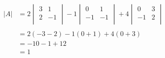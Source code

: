 \documentclass[11pt,a4paper]{article}
\begin{document}
\begin{align*}
|A| &= 2
\begin{vmatrix}
3 & 1\\
2 & -1\\
\end{vmatrix}
-1
\begin{vmatrix}
0 & 1\\
-1 & -1\\
\end{vmatrix} 
+ 4
\begin{vmatrix}
0 & 3\\
-1 & 2\\
\end{vmatrix}\\\\
& = 2 (-3-2)-1(0+1)+4(0+3)\\
& = -10 -1 +12\\
& = 1\\
\end{align*}
\end{document}
